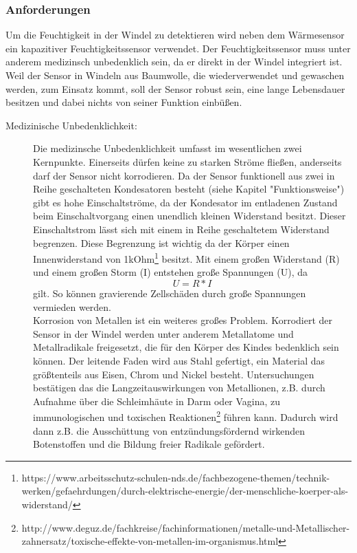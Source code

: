 \subsubsection{Anforderungen}
\label{sec:cap_requirements}
Um die Feuchtigkeit in der Windel zu detektieren wird neben dem Wärmesensor ein kapazitiver Feuchtigkeitssensor verwendet. Der Feuchtigkeitssensor muss unter anderem medizinsch unbedenklich sein, da er direkt in der Windel integriert ist. Weil der Sensor in Windeln aus Baumwolle, die wiederverwendet und gewaschen werden, zum Einsatz kommt, soll der Sensor robust sein, eine lange Lebensdauer besitzen und dabei nichts von seiner Funktion einbüßen.

\begin{description}
\item[Medizinische Unbedenklichkeit:]
Die medizinsche Unbedenklichkeit umfasst im wesentlichen zwei Kernpunkte. Einerseits dürfen keine zu starken Ströme fließen, anderseits darf der Sensor nicht korrodieren. Da der Sensor funktionell aus zwei in Reihe geschalteten Kondesatoren besteht (siehe Kapitel "Funktionsweise") gibt es hohe Einschaltströme, da der Kondesator im entladenen Zustand beim Einschaltvorgang einen unendlich kleinen Widerstand besitzt. Dieser Einschaltstrom lässt sich mit einem in Reihe geschaltetem Widerstand begrenzen. Diese Begrenzung ist wichtig da der Körper einen Innenwiderstand von 1kOhm\footnote{https://www.arbeitsschutz-schulen-nds.de/fachbezogene-themen/technik-werken/gefaehrdungen/durch-elektrische-energie/der-menschliche-koerper-als-widerstand/} besitzt. Mit einem großen Widerstand (R) und einem großen Storm (I) entstehen große Spannungen (U), da
\[U = R * I\]  gilt. So können gravierende Zellschäden durch große Spannungen vermieden werden. \\
Korrosion von Metallen ist ein weiteres großes Problem. Korrodiert der Sensor in der Windel werden unter anderem Metallatome und Metallradikale freigesetzt, die für den Körper des Kindes bedenklich sein können. Der leitende Faden wird aus Stahl gefertigt, ein Material das größtenteils aus Eisen, Chrom und Nickel besteht. Untersuchungen bestätigen das die Langzeitauswirkungen von Metallionen, z.B. durch Aufnahme über die Schleimhäute in Darm oder Vagina, zu \glqq{}immunologischen und toxischen Reaktionen\grqq{}\footnote{http://www.deguz.de/fachkreise/fachinformationen/metalle-und-Metallischer-zahnersatz/toxische-effekte-von-metallen-im-organismus.html} führen kann. Dadurch wird dann z.B. die \glqq{}Ausschüttung von entzündungsfördernd wirkenden Botenstoffen\grqq{} und \glqq{}die Bildung freier Radikale\grqq{} gefördert.
	

\end{description}
